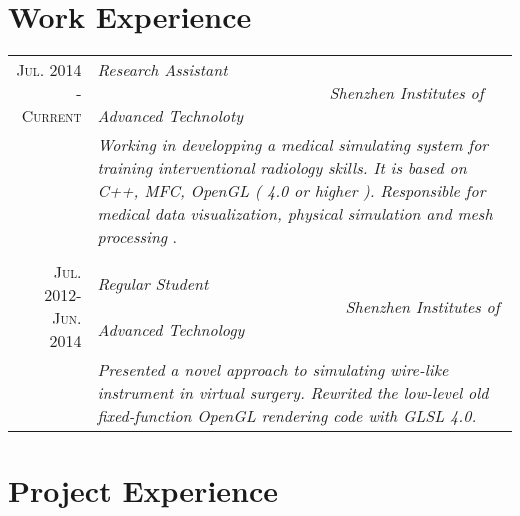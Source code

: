 \documentclass[a4paper,10pt]{article} %
\begin{document}

\section{Work Experience}

\begin{tabular}{r|p{12cm}}
\textsc{Jul. 2014 - Current} & \emph{Research Assistant} \ \ \ \ \ \ \ \ \ \ \ \ \ \ \ \ \ \ \ \ \ \ \ \ \ \ \ \ \          \emph{Shenzhen Institutes of Advanced Technoloty} \\
& \footnotesize{\emph{Working in developping a medical simulating system for training interventional radiology skills. It is based on C++, MFC, OpenGL ( 4.0 or higher ). Responsible for medical data visualization, physical simulation and mesh processing }}.\\

\multicolumn{2}{c}{} \\


\textsc{Jul. 2012- Jun. 2014} & \emph{Regular Student} \ \ \ \ \ \ \ \ \ \ \ \ \ \ \ \ \ \ \ \ \ \ \ \ \ \ \ \ \ \ \         \emph{Shenzhen Institutes of Advanced Technology} \emph{}\\
& \footnotesize{\emph{Presented a novel approach to simulating wire-like instrument in virtual surgery. Rewrited the low-level old fixed-function OpenGL rendering code with GLSL 4.0.}}\\


\end{tabular}



\section{Project Experience}
\end{document}
